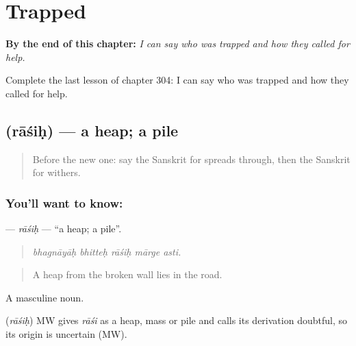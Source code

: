 
\chapter{Trapped}
\label{ch:sa-trapped}

\begin{chapteropening}
\textbf{By the end of this chapter:} \emph{I can say who was trapped and how they called for help.}

Complete the last lesson of chapter 304: I can say who was trapped and how they called for help.
\end{chapteropening}

\section[\texorpdfstring{\sk{राशिः} (rāśiḥ)}{राशिः (rāśiḥ)}]{ (rāśiḥ) — a heap; a pile}

\label{lesson:SA-C304-rasih}



\begin{quote}
Before the new one: say the Sanskrit for spreads through, then the Sanskrit for withers.
\end{quote}

\subsection*{You'll want to know: }
\textbf{} — \emph{rāśiḥ} — \textquotedblleft{}a heap; a pile\textquotedblright{}.

\begin{quote}
    
\end{quote}

\begin{quote}
\emph{bhagnāyāḥ bhitteḥ rāśiḥ mārge asti.}
\end{quote}

\begin{quote}
A heap from the broken wall lies in the road.
\end{quote}

A masculine noun.

\begin{cousinweb}
\textbf{} (\emph{rāśiḥ}) MW gives \emph{rāśi} as a heap, mass or pile and calls its derivation doubtful, so its origin is uncertain (MW).
\end{cousinweb}

